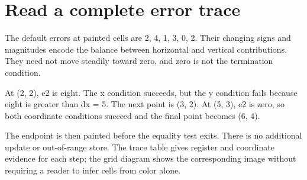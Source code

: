\section{Read a complete error
  trace}\label{007-bresenham-line-p09-read-a-complete-error-trace}

The default errors at painted cells are 2, 4, 1, 3, 0, 2. Their changing
signs and magnitudes encode the balance between horizontal and vertical
contributions. They need not move steadily toward zero, and zero is not
the termination condition.

At (2, 2), e2 is eight. The x condition succeeds, but the y condition
fails because eight is greater than dx = 5. The next point is (3, 2). At
(5, 3), e2 is zero, so both coordinate conditions succeed and the final
point becomes (6, 4).

The endpoint is then painted before the equality test exits. There is no
additional update or out-of-range store. The trace table gives register
and coordinate evidence for each step; the grid diagram shows the
corresponding image without requiring a reader to infer cells from color
alone.
